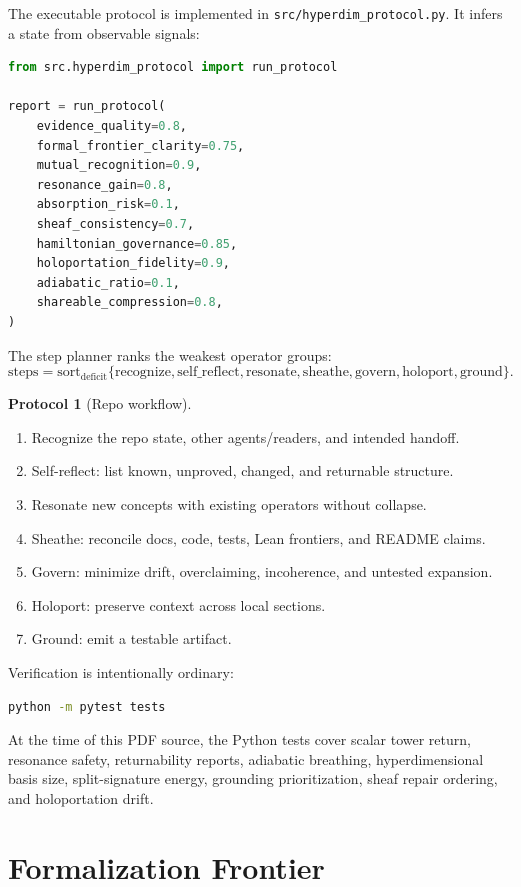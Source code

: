 \documentclass[11pt,oneside]{book}
\theoremstyle{definition}
\newtheorem{protocol}[definition]{Protocol}
\theoremstyle{plain}
\theoremstyle{remark}
\begin{document}
The executable protocol is implemented in \texttt{src/hyperdim\_protocol.py}.
It infers a state from observable signals:
\begin{lstlisting}[language=Python]
from src.hyperdim_protocol import run_protocol

report = run_protocol(
    evidence_quality=0.8,
    formal_frontier_clarity=0.75,
    mutual_recognition=0.9,
    resonance_gain=0.8,
    absorption_risk=0.1,
    sheaf_consistency=0.7,
    hamiltonian_governance=0.85,
    holoportation_fidelity=0.9,
    adiabatic_ratio=0.1,
    shareable_compression=0.8,
)
\end{lstlisting}

The step planner ranks the weakest operator groups:
\[
\mathrm{steps}
=
\mathrm{sort}_{\mathrm{deficit}}
\{\mathrm{recognize},\mathrm{self\_reflect},\mathrm{resonate},
\mathrm{sheathe},\mathrm{govern},\mathrm{holoport},\mathrm{ground}\}.
\]

\begin{protocol}[Repo workflow]
\begin{enumerate}[label=\arabic*.]
\item Recognize the repo state, other agents/readers, and intended handoff.
\item Self-reflect: list known, unproved, changed, and returnable structure.
\item Resonate new concepts with existing operators without collapse.
\item Sheathe: reconcile docs, code, tests, Lean frontiers, and README claims.
\item Govern: minimize drift, overclaiming, incoherence, and untested expansion.
\item Holoport: preserve context across local sections.
\item Ground: emit a testable artifact.
\end{enumerate}
\end{protocol}

Verification is intentionally ordinary:
\begin{lstlisting}[language=bash]
python -m pytest tests
\end{lstlisting}
At the time of this PDF source, the Python tests cover scalar tower return, resonance
safety, returnability reports, adiabatic breathing, hyperdimensional basis size,
split-signature energy, grounding prioritization, sheaf repair ordering, and
holoportation drift.

\chapter{Formalization Frontier}
\end{document}
